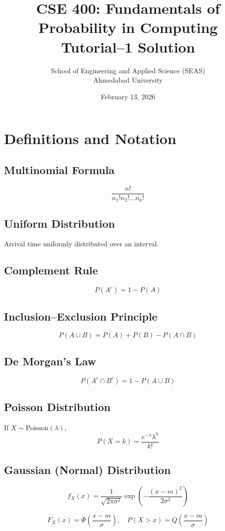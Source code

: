 \documentclass[12pt]{article}
\title{CSE 400: Fundamentals of Probability in Computing\\
Tutorial--1 Solution}
\author{School of Engineering and Applied Science (SEAS)\\
Ahmedabad University}
\date{February 13, 2026}
\begin{document}
\maketitle

\section*{Definitions and Notation}

\subsection*{Multinomial Formula}
\[
\frac{n!}{n_1! n_2! \dots n_k!}
\]

\subsection*{Uniform Distribution}
Arrival time uniformly distributed over an interval.

\subsection*{Complement Rule}
\[
P(A^c) = 1 - P(A)
\]

\subsection*{Inclusion--Exclusion Principle}
\[
P(A \cup B) = P(A) + P(B) - P(A \cap B)
\]

\subsection*{De Morgan's Law}
\[
P(A^c \cap B^c) = 1 - P(A \cup B)
\]

\subsection*{Poisson Distribution}
If $X \sim \text{Poisson}(\lambda)$,
\[
P(X = k) = \frac{e^{-\lambda} \lambda^k}{k!}
\]

\subsection*{Gaussian (Normal) Distribution}
\[
f_X(x) = \frac{1}{\sqrt{2\pi\sigma^2}} 
\exp\left(-\frac{(x-m)^2}{2\sigma^2}\right)
\]

\[
F_X(x) = \Phi\left(\frac{x-m}{\sigma}\right),
\quad
P(X > x) = Q\left(\frac{x-m}{\sigma}\right)
\]
\end{document}
